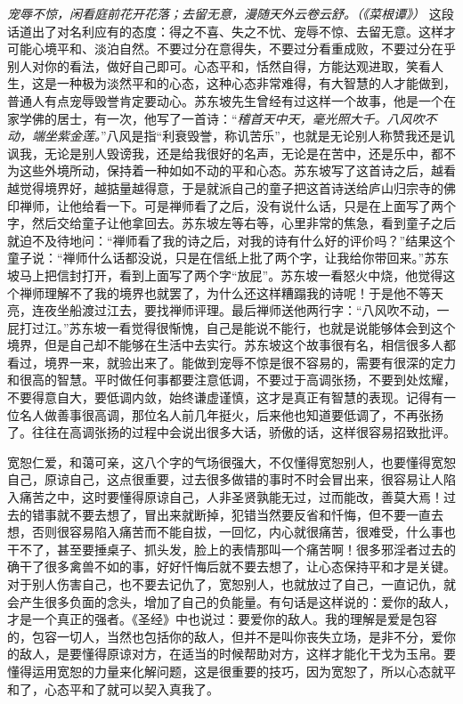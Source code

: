 \textit{宠辱不惊，闲看庭前花开花落；去留无意，漫随天外云卷云舒。（《菜根谭》）} 这段话道出了对名利应有的态度：得之不喜、失之不忧、宠辱不惊、去留无意。这样才可能心境平和、淡泊自然。不要过分在意得失，不要过分看重成败，不要过分在乎别人对你的看法，做好自己即可。心态平和，恬然自得，方能达观进取，笑看人生，这是一种极为淡然平和的心态，这种心态非常难得，有大智慧的人才能做到，普通人有点宠辱毁誉肯定要动心。苏东坡先生曾经有过这样一个故事，他是一个在家学佛的居士，有一次，他写了一首诗：“\textit{稽首天中天，毫光照大千。八风吹不动，端坐紫金莲。}”八风是指“利衰毁誉，称讥苦乐”，也就是无论别人称赞我还是讥讽我，无论是别人毁谤我，还是给我很好的名声，无论是在苦中，还是乐中，都不为这些外境所动，保持着一种如如不动的平和心态。苏东坡写了这首诗之后，越看越觉得境界好，越掂量越得意，于是就派自己的童子把这首诗送给庐山归宗寺的佛印禅师，让他给看一下。可是禅师看了之后，没有说什么话，只是在上面写了两个字，然后交给童子让他拿回去。苏东坡左等右等，心里非常的焦急，看到童子之后就迫不及待地问：“禅师看了我的诗之后，对我的诗有什么好的评价吗？”结果这个童子说：“禅师什么话都没说，只是在信纸上批了两个字，让我给你带回来。”苏东坡马上把信封打开，看到上面写了两个字“放屁”。苏东坡一看怒火中烧，他觉得这个禅师理解不了我的境界也就罢了，为什么还这样糟蹋我的诗呢！于是他不等天亮，连夜坐船渡过江去，要找禅师评理。最后禅师送他两行字：“八风吹不动，一屁打过江。”苏东坡一看觉得很惭愧，自己是能说不能行，也就是说能够体会到这个境界，但是自己却不能够在生活中去实行。苏东坡这个故事很有名，相信很多人都看过，境界一来，就验出来了。能做到宠辱不惊是很不容易的，需要有很深的定力和很高的智慧。平时做任何事都要注意低调，不要过于高调张扬，不要到处炫耀，不要得意自大，要低调内敛，始终谦虚谨慎，这才是真正有智慧的表现。记得有一位名人做善事很高调，那位名人前几年挺火，后来他也知道要低调了，不再张扬了。往往在高调张扬的过程中会说出很多大话，骄傲的话，这样很容易招致批评。

宽恕仁爱，和蔼可亲，这八个字的气场很强大，不仅懂得宽恕别人，也要懂得宽恕自己，原谅自己，这点很重要，过去很多做错的事时不时会冒出来，很容易让人陷入痛苦之中，这时要懂得原谅自己，人非圣贤孰能无过，过而能改，善莫大焉！过去的错事就不要去想了，冒出来就断掉，犯错当然要反省和忏悔，但不要一直去想，否则很容易陷入痛苦而不能自拔，一回忆，内心就很痛苦，很难受，什么事也干不了，甚至要捶桌子、抓头发，脸上的表情那叫一个痛苦啊！很多邪淫者过去的确干了很多禽兽不如的事，好好忏悔后就不要去想了，让心态保持平和才是关键。对于别人伤害自己，也不要去记仇了，宽恕别人，也就放过了自己，一直记仇，就会产生很多负面的念头，增加了自己的负能量。有句话是这样说的：爱你的敌人，才是一个真正的强者。《圣经》中也说过：要爱你的敌人。我的理解是爱是包容的，包容一切人，当然也包括你的敌人，但并不是叫你丧失立场，是非不分，爱你的敌人，是要懂得原谅对方，在适当的时候帮助对方，这样才能化干戈为玉帛。要懂得运用宽恕的力量来化解问题，这是很重要的技巧，因为宽恕了，所以心态就平和了，心态平和了就可以契入真我了。

